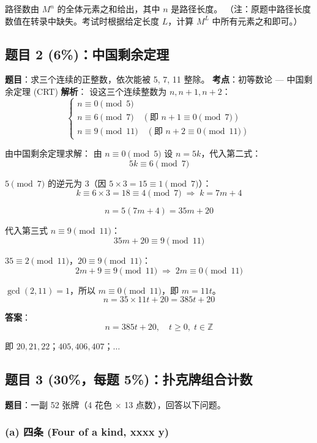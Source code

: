 \documentclass[10pt,a4paper,openany]{ctexbook}
\theoremstyle{definition}
\theoremstyle{remark}
\begin{document}
路径数由 $M^n$ 的全体元素之和给出，其中 $n$ 是路径长度。
（注：原题中路径长度数值在转录中缺失。考试时根据给定长度 $L$，计算 $M^L$ 中所有元素之和即可。）
\vspace{-2pt}

\subsection{题目 2 (6\%)：中国剩余定理}

\textbf{题目}：求三个连续的正整数，依次能被 5, 7, 11 整除。
\textbf{考点}：初等数论 — 中国剩余定理 (CRT)
\textbf{解析}：
设这三个连续整数为 $n, n+1, n+2$：
\[
\begin{cases}
n \equiv 0 \pmod{5} \\
n \equiv 6 \pmod{7} \quad (\text{即 } n+1 \equiv 0 \pmod{7}) \\
n \equiv 9 \pmod{11} \quad (\text{即 } n+2 \equiv 0 \pmod{11})
\end{cases}
\]

由中国剩余定理求解：
由 $n \equiv 0 \pmod{5}$ 设 $n = 5k$，代入第二式：
\[
 5k \equiv 6 \pmod{7} 
\]

$5 \pmod{7}$ 的逆元为 $3$（因 $5 \times 3 = 15 \equiv 1 \pmod{7}$）：
\[
 k \equiv 6 \times 3 = 18 \equiv 4 \pmod{7} \;\Rightarrow\; k = 7m + 4 
\]

\[
 n = 5(7m + 4) = 35m + 20 
\]

代入第三式 $n \equiv 9 \pmod{11}$：
\[
 35m + 20 \equiv 9 \pmod{11} 
\]

$35 \equiv 2 \pmod{11}$，$20 \equiv 9 \pmod{11}$：
\[
 2m + 9 \equiv 9 \pmod{11} \;\Rightarrow\; 2m \equiv 0 \pmod{11} 
\]

$\gcd(2,11)=1$，所以 $m \equiv 0 \pmod{11}$，即 $m = 11t$。
\[
 n = 35 \times 11t + 20 = 385t + 20 
\]

\textbf{答案}：
\[
 \boxed{n = 385t + 20,\quad t \ge 0,\; t \in \mathbb{Z}} 
\]

即 $20, 21, 22$；$405, 406, 407$；$\dots$
\vspace{-2pt}

\subsection{题目 3 (30\%，每题 5\%)：扑克牌组合计数}

\textbf{题目}：一副 52 张牌（4 花色 × 13 点数），回答以下问题。
\subsubsection{(a) 四条 (Four of a kind, xxxx y)}
\end{document}
